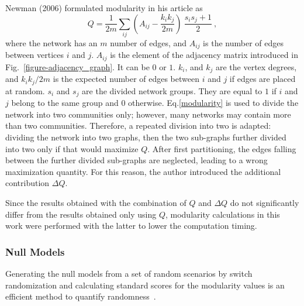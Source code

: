 Newman (2006) formulated modularity in his article as
\begin{equation} %
	Q = \frac {1} {2 m}\sum_ {ij} (A_{ij} - \frac {k_{i} k_{j}}{2 m}) \
	\frac {s_{i} s_{j} + 1} {2}\ ,
	\label{modularity}
\end{equation}
where the network has an $m$ number of edges, and $A_{ij}$ is the number of edges between vertices $i$ and $j$. $A_{ij}$ is the element of the adjacency matrix introduced in Fig.~\ref{figure-adjacency_graph}. It can be $0$ or $1$. $k_{i}$, and $k_{j}$ are the vertex degrees, and ${k_{i} k_{j}}/{2 m}$ is the expected number of edges between $i$ and $j$ if edges are placed at random. $s_{i}$ and $s_{j}$ are the divided network groups. They are equal to $1$ if $i$ and $j$ belong to the same group and $0$ otherwise. Eq.\eqref{modularity} is used to divide the network into two communities only; however, many networks may contain more than two communities. Therefore, a repeated division into two is adapted: dividing the network into two graphs, then the two sub-graphs further divided into two only if that would maximize $Q$. After first partitioning, the edges falling between the further divided sub-graphs are neglected, leading to a wrong maximization quantity. For this reason, the author introduced the additional contribution $\Delta Q$.~\cite{Newman8577}

{\color{red} Since the results obtained with the combination of $Q$ and $\Delta Q$ do not significantly differ from the results obtained only using $Q$, modularity calculations in this work were performed with the latter to lower the computation timing.}

\subsubsection*{Null Models}


Generating the null models from a set of random scenarios by switch randomization and calculating standard scores for the modularity values is an efficient method to quantify randomness~\cite{MERTEN2020, Enders2018}. 

